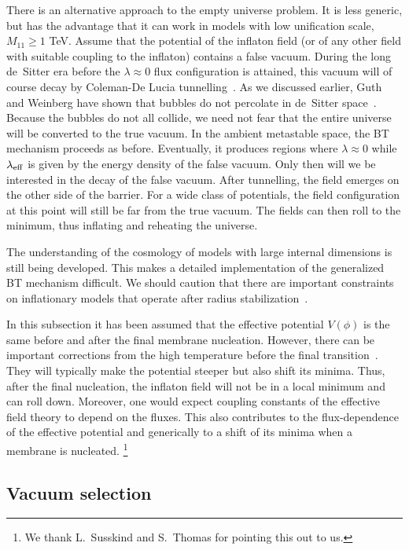 \documentclass[12pt]{article}
\begin{document}
There is an alternative approach to the empty universe problem.  It is
less generic, but has the advantage that it can work in models with
low unification scale, $M_{11} \geq 1$ TeV.  Assume that the potential
of the inflaton field (or of any other field with suitable coupling to
the inflaton) contains a false vacuum.  During the long de~Sitter era
before the $\lambda \approx 0$ flux configuration is attained, this
vacuum will of course decay by Coleman-De Lucia
tunnelling~\cite{ColDel80}.  As we discussed earlier, Guth and
Weinberg have shown that bubbles do not percolate in de~Sitter
space~\cite{GutWei83}.  Because the bubbles do not all collide, we
need not fear that the entire universe will be converted to the true
vacuum.  In the ambient metastable space, the BT mechanism proceeds as
before.  Eventually, it produces regions where $\lambda \approx 0$
while $\lambda_{\rm eff}$ is given by the energy density of the false
vacuum.  Only then will we be interested in the decay of the false
vacuum.  After tunnelling, the field emerges on the other side of the
barrier.  For a wide class of potentials, the field configuration at
this point will still be far from the true vacuum.  The fields can
then roll to the minimum, thus inflating and reheating the universe.

The understanding of the cosmology of models with large internal
dimensions is still being developed.  This makes a detailed
implementation of the generalized BT mechanism difficult.  We should
caution that there are important constraints on inflationary models
that operate after radius stabilization~\cite{KalLin98}.

In this subsection it has been assumed that the effective potential
$V(\phi)$ is the same before and after the final membrane nucleation.
However, there can be important corrections from the high temperature
before the final transition~\cite{DinRan95}.  They will typically make
the potential steeper but also shift its minima.  Thus, after the
final nucleation, the inflaton field will not be in a local minimum
and can roll down.  Moreover, one would expect coupling constants of
the effective field theory to depend on the fluxes.  This also
contributes to the flux-dependence of the effective potential and
generically to a shift of its minima when a membrane is nucleated.%
%
\footnote{We thank L.~Susskind and S.~Thomas for pointing this out to
us.}



\subsection{Vacuum selection}
\end{document}
